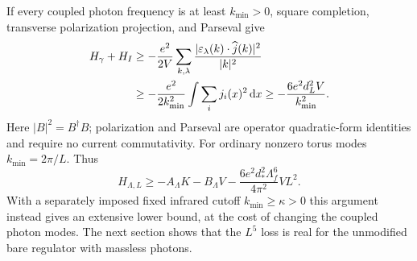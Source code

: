 If every coupled photon frequency is at least $k_{\min}>0$, square
completion, transverse polarization projection, and Parseval give
\begin{align}
 H_\gamma+H_I
 &\ge-\frac{e^2}{2V}\sum_{k,\lambda}
       \frac{|\varepsilon_\lambda(k)\cdot\widehat j(k)|^2}{|k|^2}
 \notag\\
 &\ge-\frac{e^2}{2k_{\min}^2}
          \int\sum_i j_i(x)^2\,\mathrm d x
 \ge-\frac{6e^2d_L^2V}{k_{\min}^2}.
 \label{b-photon-absolute}
\end{align}
Here $|B|^2=B^\dagger B$; polarization and Parseval are operator
quadratic-form identities and require no current commutativity.
For ordinary nonzero torus modes $k_{\min}=2\pi/L$. Thus
\begin{equation}
 H_{\Lambda,L}\ge-A_\Lambda K-B_\Lambda V
  -\frac{6e^2d_*^2\Lambda_f^6}{4\pi^2}VL^2.
 \label{b-lower-L5}
\end{equation}
With a separately imposed fixed infrared cutoff $k_{\min}\ge\kappa>0$
this argument instead gives an extensive lower bound, at the cost of
changing the coupled photon modes. The next section shows that the
$L^5$ loss is real for the unmodified bare regulator with massless photons.
